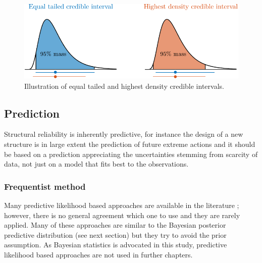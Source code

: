 \begin{figure}[htbp!] 
	\centering    
	\includegraphics[]{credible_interval_illu_crop.pdf}
	\caption{Illustration of equal tailed and highest density credible intervals.}
	\label{fig:credi_int_illu}
\end{figure}



\subsection{Prediction}
Structural reliability is inherently predictive, for instance the design of a new structure is in large extent the prediction of future extreme actions and it should be based on a prediction appreciating the uncertainties stemming from scarcity of data, not just on a model that fits best to the observations.


\subsubsection*{Frequentist method}
Many predictive likelihood based approaches are available in the literature \citep{Bjornstad1990}; however, there is no general agreement which one to use and they are rarely applied. Many of these approaches are similar to the Bayesian posterior predictive distribution (see next section) but they try to avoid the prior assumption. As Bayesian statistics is advocated in this study, predictive likelihood based approaches are not used in further chapters.

